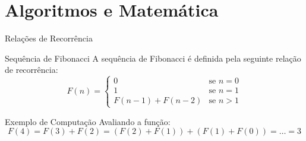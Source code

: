 \documentclass[utf8, aspectratio=169]{beamer}
\begin{document}
\section{Algoritmos e Matemática}

\begin{frame}{Relações de Recorrência}
  \begin{block}{Sequência de Fibonacci}
    A sequência de Fibonacci é definida pela seguinte relação de recorrência:
    \begin{equation*}
      F(n) = 
      \begin{cases}
        0 & \text{se } n = 0 \\
        1 & \text{se } n = 1 \\
        F(n-1) + F(n-2) & \text{se } n > 1
      \end{cases}
    \end{equation*}
  \end{block}
  \begin{exampleblock}{Exemplo de Computação}
    Avaliando a função:
    $$F(4) = F(3) + F(2) = (F(2) + F(1)) + (F(1) + F(0)) = \dots = 3$$
  \end{exampleblock}
\end{frame}
\end{document}
